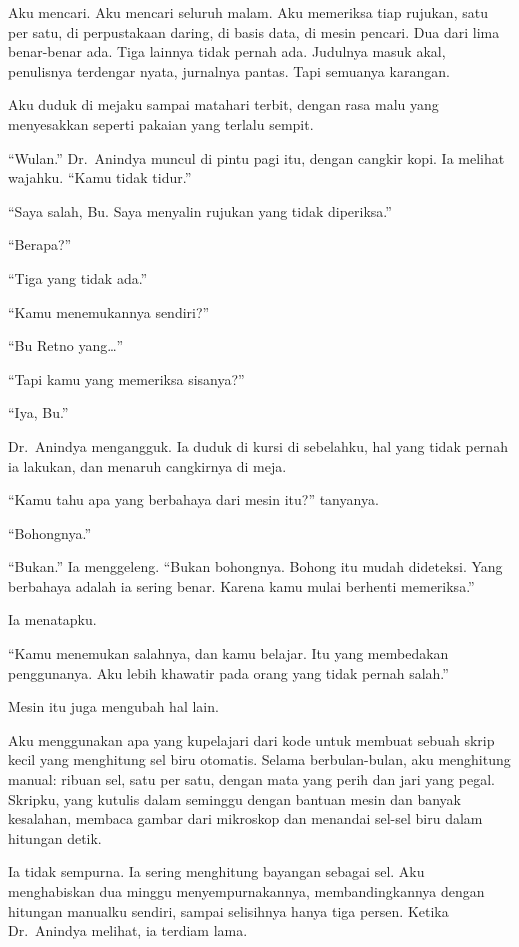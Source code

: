 \documentclass[11pt,twoside,openany]{book}
\makeatletter
\newcommand{\scenebreak}{\par\vspace{0.9em}{\centering\textsc{*\hspace{0.7em}*\hspace{0.7em}*}\par}\vspace{0.9em}\@afterindentfalse\@afterheading}
\makeatother
\begin{document}
Aku mencari. Aku mencari seluruh malam. Aku memeriksa tiap rujukan, satu per satu, di perpustakaan daring, di basis data, di mesin pencari. Dua dari lima benar-benar ada. Tiga lainnya tidak pernah ada. Judulnya masuk akal, penulisnya terdengar nyata, jurnalnya pantas. Tapi semuanya karangan.

Aku duduk di mejaku sampai matahari terbit, dengan rasa malu yang menyesakkan seperti pakaian yang terlalu sempit.

``Wulan.'' Dr.~Anindya muncul di pintu pagi itu, dengan cangkir kopi. Ia melihat wajahku. ``Kamu tidak tidur.''

``Saya salah, Bu. Saya menyalin rujukan yang tidak diperiksa.''

``Berapa?''

``Tiga yang tidak ada.''

``Kamu menemukannya sendiri?''

``Bu Retno yang\ldots{}''

``Tapi kamu yang memeriksa sisanya?''

``Iya, Bu.''

Dr.~Anindya mengangguk. Ia duduk di kursi di sebelahku, hal yang tidak pernah ia lakukan, dan menaruh cangkirnya di meja.

``Kamu tahu apa yang berbahaya dari mesin itu?'' tanyanya.

``Bohongnya.''

``Bukan.'' Ia menggeleng. ``Bukan bohongnya. Bohong itu mudah dideteksi. Yang berbahaya adalah ia sering benar. Karena kamu mulai berhenti memeriksa.''

Ia menatapku.

``Kamu menemukan salahnya, dan kamu belajar. Itu yang membedakan penggunanya. Aku lebih khawatir pada orang yang tidak pernah salah.''

\scenebreak
Mesin itu juga mengubah hal lain.

Aku menggunakan apa yang kupelajari dari kode untuk membuat sebuah skrip kecil yang menghitung sel biru otomatis. Selama berbulan-bulan, aku menghitung manual: ribuan sel, satu per satu, dengan mata yang perih dan jari yang pegal. Skripku, yang kutulis dalam seminggu dengan bantuan mesin dan banyak kesalahan, membaca gambar dari mikroskop dan menandai sel-sel biru dalam hitungan detik.

Ia tidak sempurna. Ia sering menghitung bayangan sebagai sel. Aku menghabiskan dua minggu menyempurnakannya, membandingkannya dengan hitungan manualku sendiri, sampai selisihnya hanya tiga persen. Ketika Dr.~Anindya melihat, ia terdiam lama.
\end{document}
